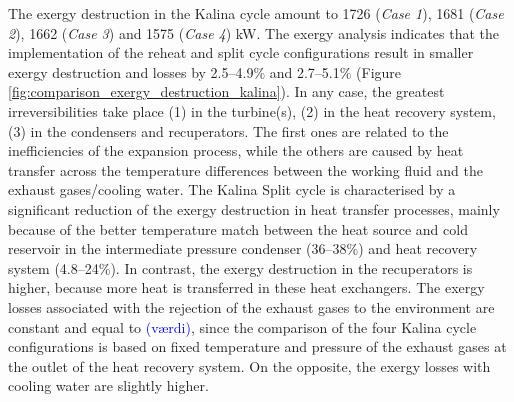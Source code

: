 \documentclass[final,times,3p]{elsarticle}
\begin{document}
The exergy destruction in the Kalina cycle amount to 1726 (\emph{Case 1}), 1681 (\emph{Case 2}), 1662 (\emph{Case 3}) and 1575 (\emph{Case 4}) kW. The exergy analysis indicates that the implementation of the reheat and split cycle configurations result in smaller exergy destruction and losses by 2.5--4.9\% and 2.7--5.1\% (Figure \ref{fig:comparison_exergy_destruction_kalina}). In any case, the greatest irreversibilities take place (1) in the turbine(s), (2) in the heat recovery system, (3) in the condensers and recuperators. The first ones are related to the inefficiencies of the expansion process, while the others are caused by heat transfer across the temperature differences between the working fluid and the exhaust gases/cooling water. The Kalina Split cycle is characterised by a significant reduction of the exergy destruction in heat transfer processes, mainly because of the better temperature match between the heat source and cold reservoir in the intermediate pressure condenser (36--38\%) and heat recovery system (4.8--24\%). In contrast, the exergy destruction in the recuperators is higher, because more heat is transferred in these heat exchangers. The exergy losses associated with the rejection of the exhaust gases to the environment are constant and equal to \textcolor{blue}{(v\ae rdi)}, since the comparison of the four Kalina cycle configurations is based on fixed temperature and pressure of the exhaust gases at the outlet of the heat recovery system. On the opposite, the exergy losses with cooling water are slightly higher. 
\end{document}
